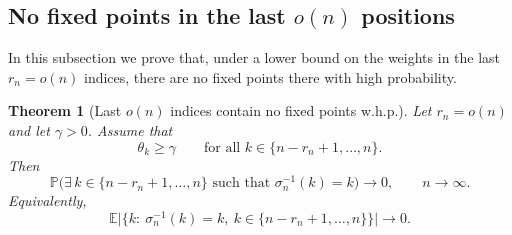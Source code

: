 \documentclass[10pt]{article}
\newtheorem{thm}{Theorem}[section]
\numberwithin{equation}{section}
\begin{document}

\subsection{No fixed points in the last $o(n)$ positions}

In this subsection we prove that, under a lower bound on the weights in the last $r_n=o(n)$ indices,
there are no fixed points there with high probability.

\begin{thm}[Last $o(n)$ indices contain no fixed points w.h.p.]\label{thm:tail_on}
Let $r_n=o(n)$ and let $\gamma>0$.
Assume that
\begin{equation}\label{eq:tail-lower}
\theta_k \ge \gamma\qquad\text{for all }k\in\{n-r_n+1,\dots,n\}.
\end{equation}
Then
\[
\mathbb P\Big(\exists\,k\in\{n-r_n+1,\dots,n\}\text{ such that }\sigma_n^{-1}(k)=k\Big)\to 0,
\qquad n\to\infty.
\]
Equivalently,
\[
\mathbb E\Big|\{k:\ \sigma_n^{-1}(k)=k,\ k\in\{n-r_n+1,\dots,n\}\}\Big|\to 0.
\]
\end{thm}
\end{document}
